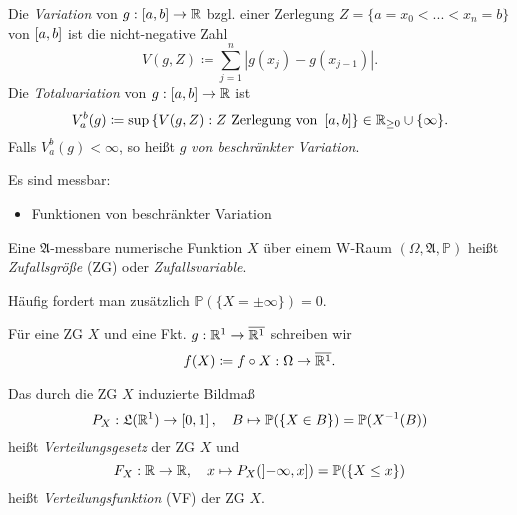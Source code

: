 \documentclass{cheat-sheet}
\newcommand{\Alg}{\mathfrak{A}} %
\newcommand{\LebAlg}{\mathfrak{L}} %
\renewcommand{\P}{\mathbb{P}} %
\renewcommand{\ER}{\overline{\R^1}} %
\begin{document}
\begin{defn}
  Die \emph{Variation} von $g : \left[ a, b \right] \to \mathbb{R}$ bzgl. einer Zerlegung $Z = \{ a = x_0 < ... < x_n = b \}$ von $\left[ a, b \right]$ ist die nicht-negative Zahl
  \[ V(g, Z) \coloneqq \sum_{j=1}^{n} |g(x_j) - g(x_{j-1})|. \]
  Die \emph{Totalvariation} von $g : \left[ a, b \right] \to \mathbb{R}$ ist
  \[ V_a^b(g) \coloneqq \sup\left\{ V(g, Z) : Z \text{ Zerlegung von } \left[ a, b \right] \right\} \in \mathbb{R}_{\ge 0} \cup \{ \infty \}. \]
  Falls $V_a^b(g) < \infty$, so heißt $g$ \emph{von beschränkter Variation}.
\end{defn}

\begin{satz}
  Es sind messbar:
  \begin{itemize}
    \item Funktionen von beschränkter Variation
  \end{itemize}
\end{satz}

\begin{defn}
  Eine $\Alg$-messbare numerische Funktion $X$ über einem W-Raum $(\Omega, \Alg, \P)$ heißt \emph{Zufallsgröße} (ZG) oder \emph{Zufallsvariable}.
\end{defn}


\begin{bem}
  Häufig fordert man zusätzlich $\P(\{ X = \pm \infty \}) = 0$.
\end{bem}

\begin{nota}
  Für eine ZG $X$ und eine Fkt. $g : \R^1 \to \ER$ schreiben wir
  \[ f(X) \coloneqq f \circ X : \Omega \to \ER. \]
\end{nota}

\begin{defn}
  Das durch die ZG $X$ induzierte Bildmaß
  \[ P_X : \LebAlg(\R^1) \to \cinterval{0}{1}, \quad B \mapsto \P(\{ X \in B \}) = \P(X^{-1}(B)) \]
  heißt \emph{Verteilungsgesetz} der ZG $X$ und
  \[ F_X : \R \to \R, \quad x \mapsto P_X(\ocinterval{-\infty}{x}) = \P(\{ X \leq x \}) \]
  heißt \emph{Verteilungsfunktion} (VF) der ZG $X$.
\end{defn}
\end{document}
